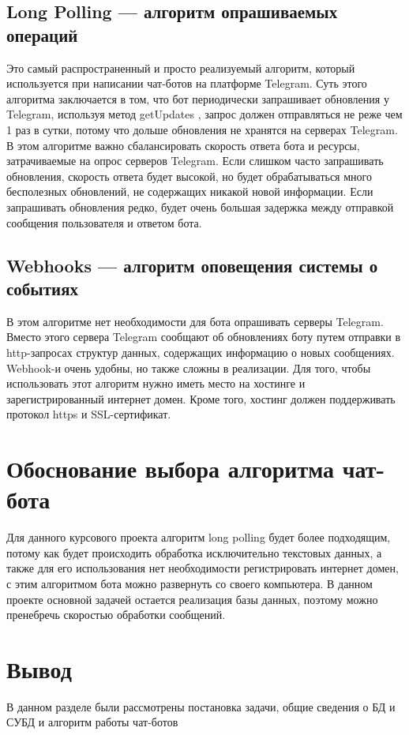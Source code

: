 \documentclass[12pt,a4paper,oneside]{report}
\begin{document}
\subsection{Long Polling — алгоритм опрашиваемых операций}
Это самый распространенный и просто реализуемый алгоритм, который используется при написании чат-ботов на платформе Telegram.
Суть этого алгоритма заключается в том, что бот периодически запрашивает обновления у Telegram, используя метод getUpdates \cite{telegram}, запрос должен отправляться не реже чем 1 раз в сутки, потому что дольше обновления не хранятся на серверах Telegram. 
В этом алгоритме важно сбалансировать скорость ответа бота и ресурсы, затрачиваемые на опрос серверов Telegram.
Если слишком часто запрашивать обновления, скорость ответа будет высокой, но будет обрабатываться много бесполезных обновлений, не содержащих никакой новой информации. Если запрашивать обновления редко, будет очень большая задержка между отправкой сообщения пользователя и ответом бота. 

\subsection{Webhooks — алгоритм оповещения системы о событиях}
В этом алгоритме нет необходимости для бота опрашивать серверы Telegram. Вместо этого сервера Telegram сообщают об обновлениях боту путем отправки в http-запросах структур данных, содержащих информацию о новых сообщениях. Webhook-и очень удобны, но также сложны в реализации. Для того, чтобы использовать этот алгоритм нужно иметь место на хостинге и зарегистрированный интернет домен. Кроме того, хостинг должен поддерживать протокол https и SSL-сертификат.

\section{Обоснование выбора алгоритма чат-бота}
Для данного курсового проекта алгоритм long polling будет более подходящим, потому как будет происходить обработка исключительно текстовых данных, а также для его использования нет необходимости регистрировать интернет домен, с этим алгоритмом бота можно развернуть со своего компьютера. В данном проекте основной задачей остается реализация базы данных, поэтому можно пренебречь скоростью обработки сообщений.

\section*{Вывод}
\quad В данном разделе были рассмотрены постановка задачи, общие сведения о БД и СУБД и алгоритм работы чат-ботов
\end{document}
